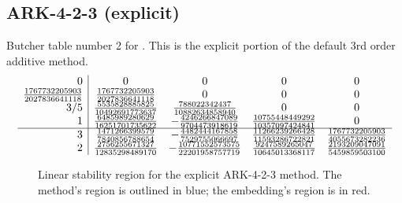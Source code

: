 \documentclass[letterpaper,10pt,english]{sphinxmanual}
\begin{document}
\subsection{ARK-4-2-3 (explicit)}
\label{Butcher:butcher-ark-4-2-3-e}\label{Butcher:ark-4-2-3-explicit}
Butcher table number 2
for {\hyperref[c_interface/User_callable:ARKodeSetERKTableNum]{}}.  This is
the explicit portion of the default 3rd order additive method.
\begin{gather}
\begin{split}\begin{array}{r|cccc}
  0 & 0 & 0 & 0 & 0 \\
  \frac{1767732205903}{2027836641118} & \frac{1767732205903}{2027836641118} & 0 & 0 & 0 \\
  3/5 & \frac{5535828885825}{10492691773637} & \frac{788022342437}{10882634858940} & 0 & 0 \\
  1 & \frac{6485989280629}{16251701735622} & -\frac{4246266847089}{9704473918619} & \frac{10755448449292}{10357097424841} & 0 \\
  \hline
  3 & \frac{1471266399579}{7840856788654} & -\frac{4482444167858}{7529755066697} & \frac{11266239266428}{11593286722821} & \frac{1767732205903}{4055673282236} \\
  2 & \frac{2756255671327}{12835298489170} & -\frac{10771552573575}{22201958757719} & \frac{9247589265047}{10645013368117} & \frac{2193209047091}{5459859503100}
\end{array}\end{split}\notag
\end{gather}\begin{figure}[htbp]
\centering
\capstart

\caption{Linear stability region for the explicit ARK-4-2-3 method.  The method's
region is outlined in blue; the embedding's region is in red.}\end{figure}
\end{document}

